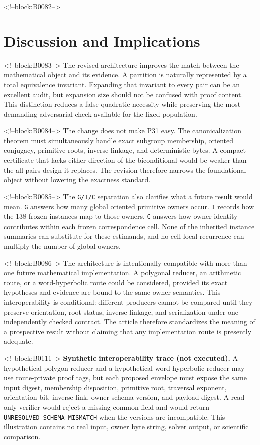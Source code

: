 \documentclass[11pt]{article}
\begin{document}
<!--block:B0082-->
\hypertarget{7-discussion-and-implications}{%
\section{Discussion and
Implications}\label{7-discussion-and-implications}}

<!--block:B0083-->
The revised architecture improves the match between the mathematical
object and its evidence. A partition is naturally represented by a total
equivalence invariant. Expanding that invariant to every pair can be an
excellent audit, but expansion size should not be confused with proof
content. This distinction reduces a false quadratic necessity while
preserving the most demanding adversarial check available for the fixed
population.

<!--block:B0084-->
The change does not make P31 easy. The canonicalization theorem must
simultaneously handle exact subgroup membership, oriented conjugacy,
primitive roots, inverse linkage, and deterministic bytes. A compact
certificate that lacks either direction of the biconditional would be
weaker than the all-pairs design it replaces. The revision therefore
narrows the foundational object without lowering the exactness standard.

<!--block:B0085-->
The \texttt{G/I/C} separation also clarifies what a future result would
mean. \texttt{G} answers how many global oriented primitive owners
occur. \texttt{I} records how the 138 frozen instances map to those
owners. \texttt{C} answers how owner identity contributes within each
frozen correspondence cell. None of the inherited instance summaries can
substitute for these estimands, and no cell-local recurrence can
multiply the number of global owners.

<!--block:B0086-->
The architecture is intentionally compatible with more than one future
mathematical implementation. A polygonal reducer, an arithmetic route,
or a word-hyperbolic route could be considered, provided its exact
hypotheses and evidence are bound to the same owner semantics. This
interoperability is conditional: different producers cannot be compared
until they preserve orientation, root status, inverse linkage, and
serialization under one independently checked contract. The article
therefore standardizes the meaning of a prospective result without
claiming that any implementation route is presently adequate.

<!--block:B0111-->
\noindent\textbf{Synthetic interoperability trace (not executed).}
A hypothetical polygon reducer and a hypothetical word-hyperbolic reducer may
use route-private proof tags, but each proposed envelope must expose the same
input digest, membership disposition, primitive root, traversal exponent,
orientation bit, inverse link, owner-schema version, and payload digest. A
read-only verifier would reject a missing common field and would return
\texttt{UNRESOLVED\_SCHEMA\_MISMATCH} when the versions are incompatible.
This illustration contains no real input, owner byte string, solver output, or
scientific comparison.
\end{document}
